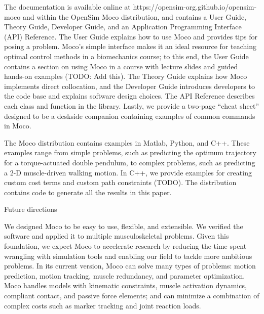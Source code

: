 \documentclass[10pt,letterpaper]{article}
\begin{document}
The documentation is available online at https://opensim-org.github.io/opensim-moco and within the OpenSim Moco distribution, and contains a User Guide, Theory Guide, Developer Guide, and an Application Programming Interface (API) Reference. The User Guide explains how to use Moco and provides tips for posing a problem. Moco’s simple interface makes it an ideal resource for teaching optimal control methods in a biomechanics course; to this end, the User Guide contains a section on using Moco in a course with lecture slides and guided hands-on examples (TODO: Add this). The Theory Guide explains how Moco implements direct collocation, and the Developer Guide introduces developers to the code base and explains software design choices. The API Reference describes each class and function in the library. Lastly, we provide a two-page “cheat sheet” designed to be a deskside companion containing examples of common commands in Moco.

The Moco distribution contains examples in Matlab, Python, and C++. These examples range from simple problems, such as predicting the optimum trajectory for a torque-actuated double pendulum, to complex problems, such as predicting a 2-D muscle-driven walking motion. In C++, we provide examples for creating custom cost terms and custom path constraints (TODO). The distribution contains code to generate all the results in this paper.

Future directions

We designed Moco to be easy to use, flexible, and extensible. We verified the software and applied it to multiple musculoskeletal problems. Given this foundation, we expect Moco to accelerate research by reducing the time spent wrangling with simulation tools and enabling our field to tackle more ambitious problems. In its current version, Moco can solve many types of problems: motion prediction, motion tracking, muscle redundancy, and parameter optimization. Moco handles models with kinematic constraints, muscle activation dynamics, compliant contact, and passive force elements; and can minimize a combination of complex costs such as marker tracking and joint reaction loads.
\end{document}

